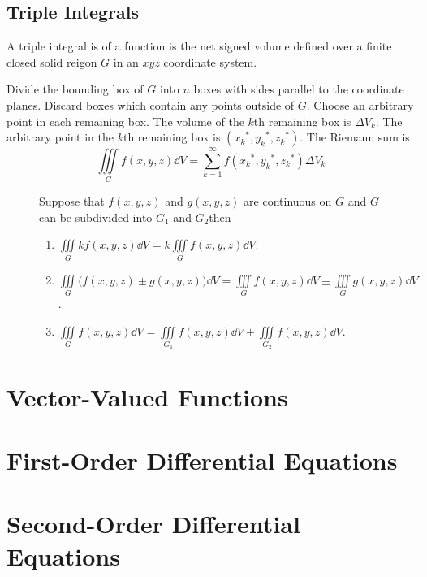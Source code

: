 \documentclass{article}
\begin{document}
\subsection{Triple Integrals}
\begin{definition}
    A triple integral is of a function is the net signed volume
    defined over a finite closed solid reigon $G$ in an $xyz$ coordinate system.
\end{definition}
\begin{theorem}
    Divide the bounding box of $G$ into $n$ boxes with sides parallel to the coordinate planes.
    Discard boxes which contain any points outside of $G$.
    Choose an arbitrary point in each remaining box.
    The volume of the $k$th remaining box is $\Delta V_k$.
    The arbitrary point in the $k$th remaining box is $({x_k}^\ast, {y_k}^\ast, {z_k}^\ast)$.
    The Riemann sum is
    \begin{equation*}
        \iiint\limits_{G} f(x, y, z)  \dd{V} = \sum_{k=1}^{\infty} f({x_k}^\ast, {y_k}^\ast, {z_k}^\ast) \Delta{}V_k
    \end{equation*}
\end{theorem}
\begin{figure}[H]
	\begin{mdframed}[style=exampledefault,frametitle={Properties of Triple Integrals}]
		\begin{theorem}
            Suppose that $f(x, y, z) $ and $g(x, y, z)$ are continuous on $G$
            and $G$ can be subdivided into $G_1$ and $G_2$then
			\begin{enumerate}[label=\normalfont\alph*)]
				\item $\displaystyle\iiint\limits_G kf(x, y, z) \dd{V} = k\iiint\limits_G f(x, y, z) \dd{V}$.
				\item $\displaystyle\iiint\limits_G \bigl(f(x, y, z) \pm g(x, y, z)\bigr) \dd{V} = \iiint\limits_G f(x, y, z) \dd{V} \pm \iiint\limits_G g(x, y, z) \dd{V}$.
                \item $\displaystyle\iiint\limits_G f(x, y, z) \dd{V} = \iiint\limits_{G_1} f(x, y, z) \dd{V} + \iiint\limits_{G_2} f(x, y, z) \dd{V}$.
			\end{enumerate}
		\end{theorem}
	\end{mdframed}
\end{figure}
\newpage
\section{Vector-Valued Functions}
\newpage
\section{First-Order Differential Equations}
\newpage
\section{Second-Order Differential Equations}
\newpage
\end{document}
